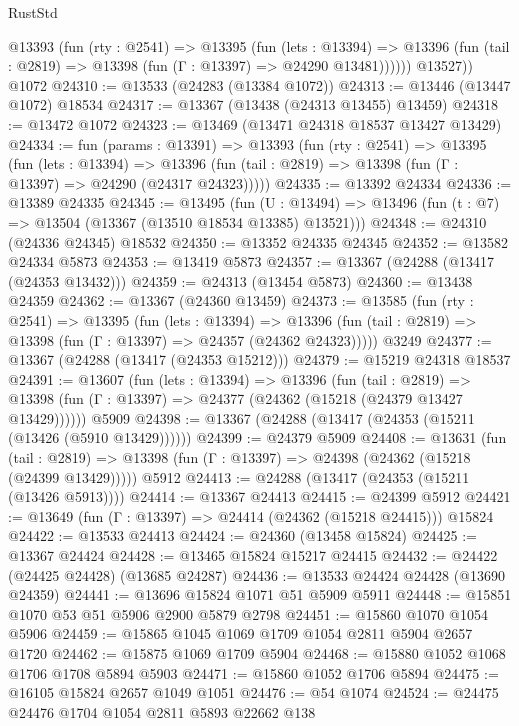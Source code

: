 \begin{lexlean}{RustStd}
\begin{coremodule}
          @13393
            (fun (rty : @2541) =>
            @13395
              (fun (lets : @13394) =>
              @13396 (fun (tail : @2819) => @13398 (fun (Γ : @13397) => @24290 @13481))))))
        @13527))
    @1072
@24310 := @13533 (@24283 (@13384 @1072))
@24313 := @13446 (@13447 @1072) @18534
@24317 := @13367 (@13438 (@24313 @13455) @13459)
@24318 := @13472 @1072
@24323 := @13469 (@13471 @24318 @18537 @13427 @13429)
@24334 := fun (params : @13391) =>
  @13393
    (fun (rty : @2541) =>
    @13395
      (fun (lets : @13394) =>
      @13396 (fun (tail : @2819) => @13398 (fun (Γ : @13397) => @24290 (@24317 @24323)))))
@24335 := @13392 @24334
@24336 := @13389 @24335
@24345 := @13495
    (fun (U : @13494) => @13496 (fun (t : @7) => @13504 (@13367 (@13510 @18534 @13385) @13521)))
@24348 := @24310 (@24336 @24345) @18532
@24350 := @13352 @24335 @24345
@24352 := @13582 @24334 @5873
@24353 := @13419 @5873
@24357 := @13367 (@24288 (@13417 (@24353 @13432)))
@24359 := @24313 (@13454 @5873)
@24360 := @13438 @24359
@24362 := @13367 (@24360 @13459)
@24373 := @13585
    (fun (rty : @2541) =>
    @13395
      (fun (lets : @13394) =>
      @13396 (fun (tail : @2819) => @13398 (fun (Γ : @13397) => @24357 (@24362 @24323)))))
    @3249
@24377 := @13367 (@24288 (@13417 (@24353 @15212)))
@24379 := @15219 @24318 @18537
@24391 := @13607
    (fun (lets : @13394) =>
    @13396
      (fun (tail : @2819) =>
      @13398 (fun (Γ : @13397) => @24377 (@24362 (@15218 (@24379 @13427 @13429))))))
    @5909
@24398 := @13367 (@24288 (@13417 (@24353 (@15211 (@13426 (@5910 @13429))))))
@24399 := @24379 @5909
@24408 := @13631
    (fun (tail : @2819) => @13398 (fun (Γ : @13397) => @24398 (@24362 (@15218 (@24399 @13429)))))
    @5912
@24413 := @24288 (@13417 (@24353 (@15211 (@13426 @5913))))
@24414 := @13367 @24413
@24415 := @24399 @5912
@24421 := @13649 (fun (Γ : @13397) => @24414 (@24362 (@15218 @24415))) @15824
@24422 := @13533 @24413
@24424 := @24360 (@13458 @15824)
@24425 := @13367 @24424
@24428 := @13465 @15824 @15217 @24415
@24432 := @24422 (@24425 @24428) (@13685 @24287)
@24436 := @13533 @24424 @24428 (@13690 @24359)
@24441 := @13696 @15824 @1071 @51 @5909 @5911
@24448 := @15851 @1070 @53 @51 @5906 @2900 @5879 @2798
@24451 := @15860 @1070 @1054 @5906
@24459 := @15865 @1045 @1069 @1709 @1054 @2811 @5904 @2657 @1720
@24462 := @15875 @1069 @1709 @5904
@24468 := @15880 @1052 @1068 @1706 @1708 @5894 @5903
@24471 := @15860 @1052 @1706 @5894
@24475 := @16105 @15824 @2657 @1049 @1051
@24476 := @54 @1074
@24524 := @24475
    @24476
    @1704
    @1054
    @2811
    @5893
    @22662
    @138

\end{coremodule}
\end{lexlean}
